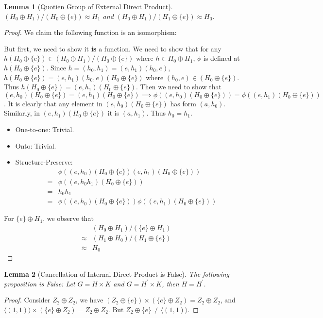 \documentclass[14pt]{extarticle}
\newtheorem{lemma}{Lemma}[section]
\begin{document}
\begin{lemma}[Quotien Group of External Direct Product]
  $(H_0 \oplus H_1) / (H_0 \oplus \{ e \}) \approx H_1$ and $(H_0 \oplus H_1) / (H_1 \oplus \{ e \}) \approx H_0$.
\end{lemma}
\begin{proof}
  {
    \newcommand{\coset}{(H_0 \oplus \{ e \})}

    We claim the following function is an isomorphism:

    \begin{center}
      \boxed{\phi((e , h)\coset) = h}
    \end{center}

    But first, we need to show it \textbf{is} a function.
    We need to show that for any $h\coset \in (H_0 \oplus H_1)/\coset$ where $h \in H_0 \oplus H_1$,
    $\phi$ is defined at $h\coset$. Since $h = (h_0 , h_1) = (e , h_1) (h_0 , e)$,
    $h\coset = (e , h_1) (h_0 , e) \coset$ where $(h_0 , e) \in \coset$.
    Thus $h\coset = (e , h_1) \coset$. Then we need to show that
    $(e , h_0)\coset = (e , h_1)\coset \implies \phi((e , h_0)\coset) = \phi((e, h_1)\coset)$.
    It is clearly that any element in $(e , h_0)\coset$ has form $(a , h_0)$.
    Similarly, in $(e , h_1)\coset$ it is $(a , h_1)$. Thus $h_0 = h_1$.

    \begin{itemize}
      \item One-to-one: Trivial.
      \item Onto: Trivial.
      \item Structure-Preserve:
        \begin{align*}
           & \phi((e , h_0)\coset (e , h_1)\coset) \\
          =& \phi((e , h_0 h_1)\coset) \\
          =& h_0 h_1 \\
          =& \phi((e , h_0)\coset) \phi((e , h_1)\coset)
        \end{align*}
    \end{itemize}
  }

  For $\{ e \} \oplus H_1$, we observe that 
  \begin{align*}
     & (H_0 \oplus H_1) / (\{ e \} \oplus H_1) \\
    \approx & (H_1 \oplus H_0) / (H_1 \oplus \{ e \}) \\
    \approx & H_0
  \end{align*}
\end{proof}

\begin{lemma}[Cancellation of Internal Direct Product is False]
  The following proposition is False: 
  Let $G = H \times K$ and $G = H^\prime \times K$, then $H = H^\prime$.
\end{lemma}
\begin{proof}
  Consider $Z_2 \oplus Z_2$, 
  we have $(Z_2 \oplus \{ e \}) \times (\{ e \} \oplus Z_2) = Z_2 \oplus Z_2$,
  and $\langle (1 , 1) \rangle \times (\{ e \} \oplus Z_2) = Z_2 \oplus Z_2$.
  But $Z_2 \oplus \{ e \} \neq \langle (1 , 1) \rangle$.
\end{proof}
\end{document}
